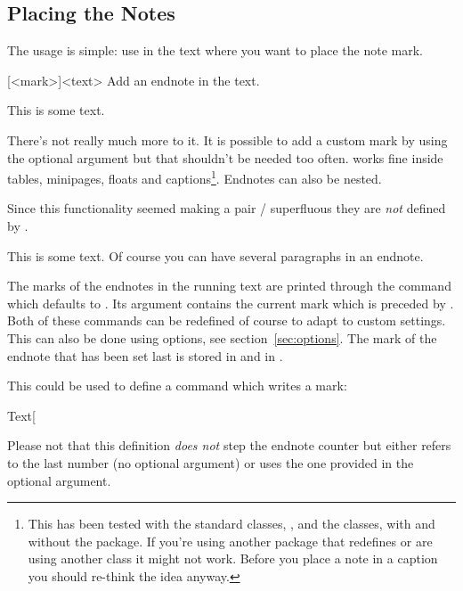 \documentclass[toc=bib,toc=index]{cnpkgdoc}
\makeatletter
\providecommand*\sinceversion[1]{%
  \@bsphack
  \marginnote{%
    \footnotesize\sffamily\RaggedRight
    \textcolor{black!75}{Introduced in version~#1}}%
  \@esphack}
\makeatother
\begin{document}
\subsection{Placing the Notes}
The usage is simple: use  in the text where you want to place the
note mark.
\begin{beschreibung}
 [<mark>]{<text>}\newline
   Add an endnote in the text.
\end{beschreibung}
\begin{beispiel}
 This is some text.
\end{beispiel}
There's not really much more to it. It is possible to add a custom mark by
using the optional argument but that shouldn't be needed too often. 
works fine inside tables, minipages, floats and captions\footnote{This has been
tested with the standard classes, , and the 
classes, with and without the  package. If you're using another
package that redefines  or are using another class it might not
work. Before you place a note in a caption you should re-think the idea anyway.}.
Endnotes can also be nested.

Since this functionality seemed making a pair /
superfluous they are \emph{not} defined by \enotez.
\begin{beispiel}
 This is some text.
 Of course you can have several paragraphs\endnote{\kant[1-3]} in an endnote.
\end{beispiel}

The marks of the endnotes in the running text are printed through the command
 which defaults to . Its argument
contains the current mark which is preceded by . Both of these
commands can be redefined of course to adapt to custom settings. This can also
be done using options, see section~\ref{sec:options}. The mark of the endnote
that has been set last is stored in  and in .%
\sinceversion{0.6}

This could be used to define a command which writes a mark:
\begin{beispiel}
 \makeatletter
 \def\endnotemark{\@ifnextchar[{\@endnotemark}{\@endnotemark[\theendnote]}}
 \def\@endnotemark[#1]{\enotezwritemark{\enmarkstyle#1}}
 \makeatother
 Text\endnotemark
\end{beispiel}
Please not that this definition \emph{does not} step the endnote counter but
either refers to the last number (no optional argument) or uses the one provided
in the optional argument.
\end{document}
